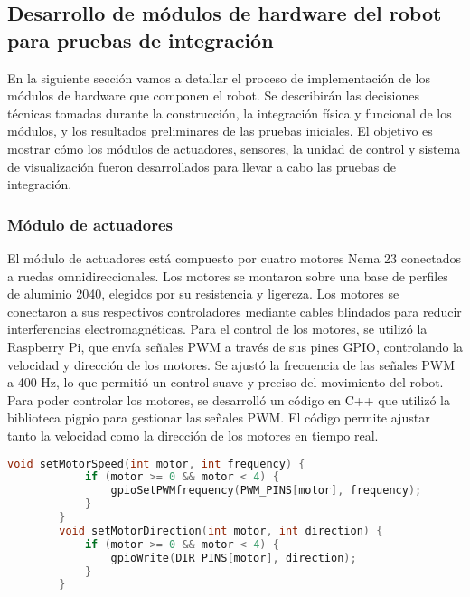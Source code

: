 \subsection{Desarrollo de m\'odulos de hardware del robot para pruebas de integraci\'on}
\label{sec:Desarrollo de m\'odulos de hardware del robot para pruebas de integraci\'on}
    En la siguiente secci\'on vamos a detallar el proceso de implementaci\'on de los m\'odulos
        de hardware que componen el robot. Se describir\'an las decisiones t\'ecnicas tomadas
        durante la construcci\'on, la integraci\'on f\'isica y funcional de los m\'odulos, y los
        resultados preliminares de las pruebas iniciales. El objetivo es mostrar c\'omo los
        m\'odulos de actuadores, sensores, la unidad de control y sistema de visualizaci\'on
        fueron desarrollados para llevar a cabo las pruebas de integraci\'on.
    \vskip 0.5cm
    \subsubsection{M\'odulo de actuadores}
    El m\'odulo de actuadores est\'a compuesto por cuatro motores Nema 23 conectados a
        ruedas omnidireccionales. Los motores se montaron sobre una base de perfiles de
        aluminio 2040, elegidos por su resistencia y ligereza. Los motores se conectaron a sus
        respectivos controladores mediante cables blindados para reducir interferencias
        electromagn\'eticas.
    \vskip 0.5cm
    Para el control de los motores, se utiliz\'o la Raspberry Pi, que env\'ia se\~nales PWM a
        trav\'es de sus pines GPIO, controlando la velocidad y direcci\'on de los motores. Se
        ajust\'o la frecuencia de las se\~nales PWM a 400 Hz, lo que permiti\'o un control suave y
        preciso del movimiento del robot.
    \vskip 0.5cm
    Para poder controlar los motores, se desarroll\'o un c\'odigo en C++ que utiliz\'o la
        biblioteca pigpio para gestionar las se\~nales PWM. El c\'odigo permite ajustar tanto la
        velocidad como la direcci\'on de los motores en tiempo real.
    \vskip 0.5cm
    \begin{lstlisting}[language={C++}, caption={C\'odigo de ejemplo de motores}, label={Script}]
        void setMotorSpeed(int motor, int frequency) {
            if (motor >= 0 && motor < 4) {
                gpioSetPWMfrequency(PWM_PINS[motor], frequency);
            }
        }
        void setMotorDirection(int motor, int direction) {
            if (motor >= 0 && motor < 4) {
                gpioWrite(DIR_PINS[motor], direction);
            }
        }
    \end{lstlisting}
    \vskip 0.5cm
